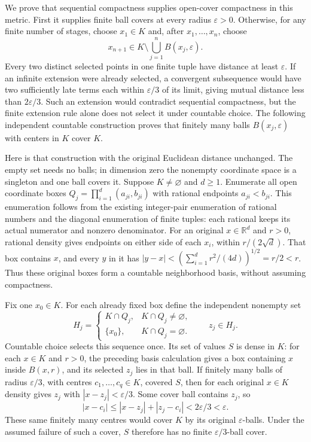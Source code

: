\documentclass[
  11pt,
]{article}
\begin{document}
We prove that sequential compactness supplies open-cover compactness in
this metric. First it supplies finite ball covers at every radius
\(\varepsilon>0\). Otherwise, for any finite number of stages, choose
\(x_1\in K\) and, after \(x_1,\ldots,x_n\), choose \[
x_{n+1}\in K\setminus\bigcup_{j=1}^n B(x_j,\varepsilon).
\tag{RT24}
\] Every two distinct selected points in one finite tuple have distance
at least \(\varepsilon\). If an infinite extension were already
selected, a convergent subsequence would have two sufficiently late
terms each within \(\varepsilon/3\) of its limit, giving mutual distance
less than \(2\varepsilon/3\). Such an extension would contradict
sequential compactness, but the finite extension rule alone does not
select it under countable choice. The following independent countable
construction proves that finitely many balls \(B(x_j,\varepsilon)\) with
centers in \(K\) cover \(K\).

Here is that construction with the original Euclidean distance
unchanged. The empty set needs no balls; in dimension zero the nonempty
coordinate space is a singleton and one ball covers it. Suppose
\(K\ne\varnothing\) and \(d\geq1\). Enumerate all open coordinate boxes
\(Q_j=\prod_{i=1}^d(a_{ji},b_{ji})\) with rational endpoints
\(a_{ji}<b_{ji}\). This enumeration follows from the existing
integer-pair enumeration of rational numbers and the diagonal
enumeration of finite tuples: each rational keeps its actual numerator
and nonzero denominator. For an original \(x\in\mathbb R^d\) and
\(r>0\), rational density gives endpoints on either side of each
\(x_i\), within \(r/(2\sqrt d)\). That box contains \(x\), and every
\(y\) in it has \(|y-x|<(\sum_{i=1}^d r^2/(4d))^{1/2}=r/2<r\). Thus
these original boxes form a countable neighborhood basis, without
assuming compactness.

Fix one \(x_0\in K\). For each already fixed box define the independent
nonempty set \[
 H_j=
 \begin{cases}
  K\cap Q_j,&K\cap Q_j\ne\varnothing,\\
  \{x_0\},&K\cap Q_j=\varnothing .
 \end{cases}
 \qquad z_j\in H_j .
 \tag{RT24a}
\] Countable choice selects this sequence once. Its set of values \(S\)
is dense in \(K\): for each \(x\in K\) and \(r>0\), the preceding basis
calculation gives a box containing \(x\) inside \(B(x,r)\), and its
selected \(z_j\) lies in that ball. If finitely many balls of radius
\(\varepsilon/3\), with centres \(c_1,\ldots,c_q\in K\), covered \(S\),
then for each original \(x\in K\) density gives \(z_j\) with
\(|x-z_j|<\varepsilon/3\). Some cover ball contains \(z_j\), so \[
 |x-c_i|\leq |x-z_j|+|z_j-c_i|
                  <2\varepsilon/3<\varepsilon .
 \tag{RT24b}
\] These same finitely many centres would cover \(K\) by its original
\(\varepsilon\)-balls. Under the assumed failure of such a cover, \(S\)
therefore has no finite \(\varepsilon/3\)-ball cover.
\end{document}
